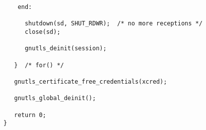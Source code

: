 \begin{verbatim}
    end:

      shutdown(sd, SHUT_RDWR);  /* no more receptions */
      close(sd);

      gnutls_deinit(session);

   }  /* for() */

   gnutls_certificate_free_credentials(xcred);

   gnutls_global_deinit();

   return 0;
}

\end{verbatim}
